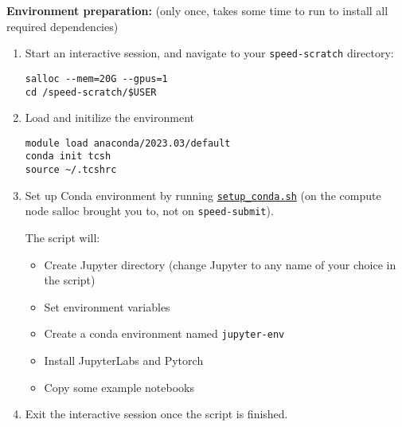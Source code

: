 \textbf{Environment preparation:} (only once, takes some time to run to install all required dependencies)
\begin{enumerate}

\item Start an interactive session, and navigate to your \texttt{speed-scratch} directory:
\begin{verbatim}
salloc --mem=20G --gpus=1
cd /speed-scratch/$USER
\end{verbatim}

\item Load and initilize the environment
\begin{verbatim}
module load anaconda/2023.03/default
conda init tcsh
source ~/.tcshrc
\end{verbatim}

\item Set up Conda environment by running \href{https://github.com/NAG-DevOps/speed-hpc/blob/master/src/jupyter/jupyterlabs-conda/setup_conda.sh}{\texttt{setup\_conda.sh}}
(on the compute node salloc brought you to, not on \texttt{speed-submit}).

%    

The script will:
\begin{itemize}
    \item Create Jupyter directory (change Jupyter to any name of your choice in the script)
    \item Set environment variables
    \item Create a conda environment named \texttt{jupyter-env}
    \item Install JupyterLabs and Pytorch
    \item Copy some example notebooks
\end{itemize}

\item Exit the interactive session once the script is finished.

\end{enumerate}

